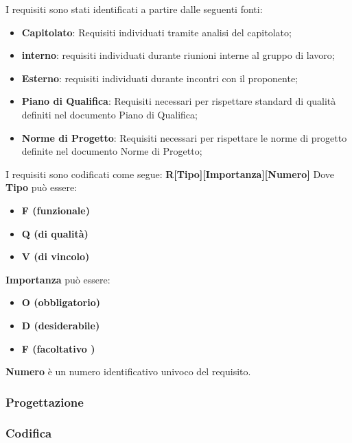 I requisiti sono stati identificati a partire dalle seguenti fonti:
\begin{itemize}
    \item \textbf{Capitolato}: Requisiti individuati tramite analisi del capitolato;
    \item \textbf{interno}: requisiti individuati durante riunioni interne al gruppo di lavoro;
    \item \textbf{Esterno}: requisiti individuati durante incontri con il proponente;
    \item \textbf{Piano di Qualifica}: Requisiti necessari per rispettare standard di qualità definiti nel documento Piano di Qualifica;
    \item \textbf{Norme di Progetto}: Requisiti necessari per rispettare le norme di progetto definite nel documento Norme di Progetto;
\end{itemize}

I requisiti sono codificati come segue: \textbf{R[Tipo][Importanza][Numero]}
\newline
Dove \textbf{Tipo} può essere:
\begin{itemize}
    \item \textbf{F (funzionale)}
    \item \textbf{Q (di qualità)}
    \item \textbf{V (di vincolo)}
\end{itemize}
\textbf{Importanza} può essere:
\begin{itemize}
    \item \textbf{O (obbligatorio)}
    \item \textbf{D (desiderabile)}
    \item \textbf{F (facoltativo )}
\end{itemize}
\textbf{Numero} è un numero identificativo univoco del requisito.


\subsubsection{Progettazione}
\subsubsection{Codifica}
